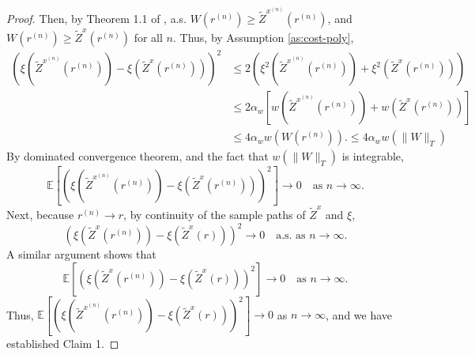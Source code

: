 \documentclass[11pt]{article}
\theoremstyle{definition}
\theoremstyle{plain}
\begin{document}
\begin{appendices}
\begin{proof}
Then, by Theorem 1.1 of \cite{KellaRamasubramanian2012},  
a.s. \( W(r^{(n)}) \geq \tilde{Z}^{x^{(n)}}(r^{(n)}) \), and  
$W(r^{(n)}) \geq \tilde{Z}^x(r^{(n)})$ for all $n$. Thus, by Assumption \ref{as:cost-poly}, 
\begin{align*}
(\xi(\tilde{Z}^{x^{(n)}}(r^{(n)})) - \xi(\tilde{Z}^x(r^{(n)})))^2 
& \leq 2 \left( \xi^2(\tilde{Z}^{x^{(n)}}(r^{(n)})) + \xi^2(\tilde{Z}^x(r^{(n)})) \right) \\
& \leq 2\alpha_w \left[ w\left(\tilde{Z}^{x^{(n)}}(r^{(n)})\right) + w\left(\tilde{Z}^x(r^{(n)})\right)\right] \\
& \leq 4\alpha_w w\left(W(r^{(n)})\right). \leq 4\alpha_w w\left(\|W\|_T\right)
\end{align*}
By dominated convergence theorem, and the fact that $w\left(\|W\|_T\right)$ is integrable, 
\[
\mathbb{E} \left[ (\xi(\tilde{Z}^{x^{(n)}}(r^{(n)})) - \xi(\tilde{Z}^x(r^{(n)})))^2 \right] \to 0 
\quad \text{as } n \to \infty.
\]
Next, because \( r^{(n)} \to r \), by continuity of the sample paths of \( \tilde{Z}^x \)  
and \( \xi \),  
\[
(\xi(\tilde{Z}^x(r^{(n)})) - \xi(\tilde{Z}^x(r)))^2 \to 0 \quad \text{a.s. as } n \to \infty.
\]
A similar argument shows that  
\[
\mathbb{E} \left[ \left( \xi(\tilde{Z}^x(r^{(n)})) - \xi(\tilde{Z}^x(r)) \right)^2 \right] \to 0 
\quad \text{as } n \to \infty.
\]
Thus, $\mathbb{E} \left[ \left( \xi(\tilde{Z}^{x^{(n)}}(r^{(n)})) - \xi(\tilde{Z}^x(r)) \right)^2 \right] \to 0$ as $n \to \infty$, and we have established Claim 1.

%


\end{proof}
\end{appendices}
\end{document}
